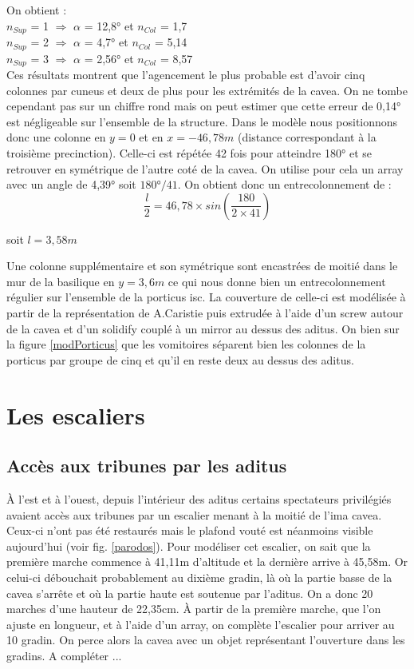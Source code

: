 On obtient : \\
$n_{Sup}$ = 1 $\Rightarrow$ $\alpha$ = 12,8° et $n_{Col}$ = 1,7 \\
$n_{Sup}$ = 2 $\Rightarrow$ $\alpha$ = 4,7° et $n_{Col}$ = 5,14 \\
$n_{Sup}$ = 3 $\Rightarrow$ $\alpha$ = 2,56° et $n_{Col}$ = 8,57 \\


Ces résultats montrent que l'agencement le plus probable est d'avoir cinq colonnes par cuneus et deux de plus pour les extrémités de la cavea. On ne tombe cependant pas sur un chiffre rond mais on peut estimer que cette erreur  de 0,14° est négligeable sur l'ensemble de la structure. Dans le modèle nous positionnons donc une colonne en $y=0$ et en $x=-46,78m$ (distance correspondant à la troisième precinction). Celle-ci est répétée 42 fois pour atteindre 180° et se retrouver en symétrique de l'autre coté de la cavea. On utilise pour cela un \gls{array} avec un angle de 4,39° soit $180°/41$. On obtient donc un entrecolonnement de :
\begin{equation}
	\frac{l}{2} =  46,78 \times  sin(\frac{180}{2 \times 41}) 
\end{equation}
\begin{center}
	soit $l = 3,58m$
\end{center}	

Une colonne supplémentaire et son symétrique sont encastrées de moitié dans le mur de la basilique en $y=3,6m$ ce qui nous donne bien un entrecolonnement régulier sur l'ensemble de la \gls{porticus isc}. La couverture de celle-ci est modélisée à partir de la représentation de A.Caristie \cite[Pl. III et VI]{orangePl} puis extrudée à l'aide d'un \gls{screw} autour de la cavea et d'un \gls{solidify} couplé à un \gls{mirror} au dessus des aditus. On bien sur la figure \ref{modPorticus} que les vomitoires séparent bien les colonnes de la porticus par groupe de cinq et qu'il en reste deux au dessus des aditus.

\section{Les escaliers} \label{sect-escaliers}

\subsection{Accès aux tribunes par les aditus}
\`A l'est et à l'ouest, depuis l'intérieur des aditus certains spectateurs privilégiés avaient accès aux tribunes par un escalier menant à la moitié de l'ima cavea. Ceux-ci n'ont pas été restaurés mais le plafond vouté est néanmoins visible aujourd'hui (voir fig. \ref{parodos}). Pour modéliser cet escalier, on sait que la première marche commence à 41,11m d'altitude et la dernière arrive à 45,58m. Or celui-ci débouchait probablement au dixième gradin, là où la partie basse de la cavea s'arrête et où la partie haute est soutenue par l'aditus. On a donc 20 marches d'une hauteur de 22,35cm. \`{A} partir de la première marche, que l'on ajuste en longueur, et à l'aide d'un \gls{array}, on complète l'escalier pour arriver au 10 gradin. On perce alors la cavea avec un objet représentant l'ouverture dans les gradins. A compléter ...


